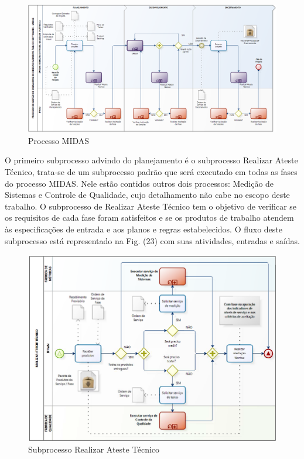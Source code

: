 \begin{anexosenv}
\begin{figure}[H]
		\centering
		\label{fig01}
			\includegraphics[scale=0.3]{figuras/processoMIDAS.png}
		\caption{Processo MIDAS \cite{IPHAN:2013}}
\end{figure}

O primeiro subprocesso advindo do planejamento é o subprocesso Realizar Ateste Técnico, trata-se de um subprocesso padrão que será executado em todas as fases do processo MIDAS. Nele estão contidos outros dois processos: Medição de Sistemas e Controle de Qualidade, cujo detalhamento não cabe no escopo deste trabalho. O subprocesso de Realizar Ateste Técnico tem o objetivo de verificar se os requisitos de cada fase foram satisfeitos e se os produtos de trabalho atendem às especificações de entrada e aos planos e regras estabelecidos. O fluxo deste subprocesso está representado na Fig. (23) com suas atividades, entradas e saídas.

\begin{figure}[H]
		\centering
		\label{fig01}
			\includegraphics[scale=0.7]{figuras/subprocessoAteste.png}
		\caption{Subprocesso Realizar Ateste Técnico \cite{IPHAN:2013}}
\end{figure}


\end{anexosenv}
